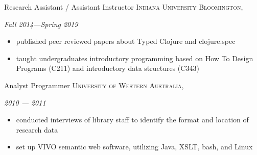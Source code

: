 \documentclass[10pt,a4paper]{article}
\begin{document}
\headedsection
  {{Research Assistant / Assistant Instructor}}
  {\textsc{Indiana University Bloomington, }} {%
    {\textit{Fall 2014---Spring 2019}}
    {
    \begin{itemize}
      \item published peer reviewed papers about Typed Clojure and clojure.spec
      \item taught undergraduates introductory programming based on How To Design Programs (C211) 
        and introductory data structures (C343)
    \end{itemize}
    }
}



\headedsection
  {Analyst Programmer}
  {\textsc{University of Western Australia, }}
  {%
    {\textit{2010 --- 2011}}
    {
      \begin{itemize}
        \item conducted interviews of library staff to identify
          the format and location of research data
        \item set up VIVO semantic web software, utilizing Java, XSLT,
          bash, and Linux
      \end{itemize}
    }
  }
\end{document}
